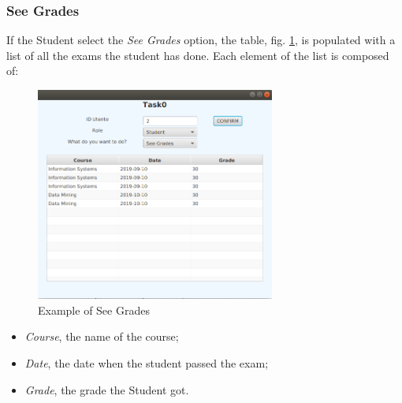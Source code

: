 \documentclass{report}
\begin{document}
\subsubsection*{See Grades}
If the Student select the \textit{See Grades} option, the table, fig. \ref{fig:SeeGrades}, is populated with a list of all the exams the student has done. Each element of the list is composed of:
\begin{figure} [h!]
	\centering
	\includegraphics[width=0.7\textwidth]{SeeGrades.png}
	\caption{Example of See Grades}
	\label{fig:SeeGrades}
\end{figure}
\begin{itemize}
	\item \textit{Course}, the name of the course;
	\item \textit{Date}, the date when the student passed the exam;
	\item \textit{Grade}, the grade the Student got. 
\end{itemize}
\end{document}

